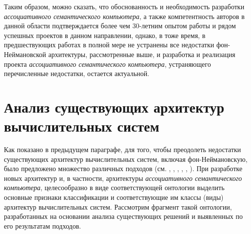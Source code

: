 Таким образом, можно сказать, что обоснованность и необходимость разработки \textit{ассоциативного семантического компьютера}, а также компетентность авторов в данной области подтверждается более чем 30-летним опытом работы и рядом успешных проектов в данном направлении, однако, в тоже время, в предшествующих работах в полной мере не устранены все недостатки фон-Неймановской архитектуры, рассмотренные выше, и разработка и реализация проекта \textit{ассоциативного семантического компьютера}, устраняющего перечисленные недостатки, остается актуальной.

\section{Анализ существующих архитектур вычислительных систем}
\label{sec_comp_archs}
Как показано в предыдущем параграфе, для того, чтобы преодолеть недостатки существующих архитектур вычислительных систем, включая фон-Неймановскую, было предложено множество различных подходов (см. , , , , , ). При разработке новых архитектур и, в частности, архитектуры \textit{ассоциативного семантического компьютера}, целесообразно в виде соответствующей онтологии выделить основные признаки классификации и соответствующие им классы (виды) архитектур вычислительных систем. Рассмотрим фрагмент такой онтологии, разработанных на основании анализа существующих решений и выявленных по его результатам подходов.

